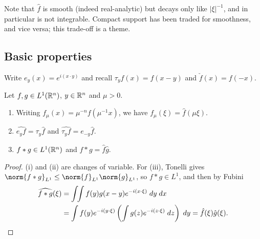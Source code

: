 \documentclass[a4paper]{scrartcl}
\begin{document}
\begin{example}
\begin{center}
\end{center}
	Note that $\hat f$ is smooth (indeed real-analytic) but decays only like $|\xi|^{-1}$, and in particular is not integrable. Compact support has been traded for smoothness, and vice versa; this trade-off is a theme.
\end{example}

\subsection{Basic properties}

Write $e_y(x) = e^{i(x\cdot y)}$ and recall $\tau_y f(x) = f(x-y)$ and $\check f(x) = f(-x)$.

\begin{lemma}\label{lem:ftbasic}
	Let $f, g \in L^1(\mathbb{R}^n)$, $y \in \mathbb{R}^n$ and $\mu > 0$.
	\begin{enumerate}[label=(\roman*)]
		\item Writing $f_\mu(x) = \mu^{-n}f(\mu^{-1}x)$, we have $\widehat{f_\mu}(\xi) = \hat f(\mu\xi)$.
		\item $\widehat{e_y f} = \tau_y \hat f$ and $\widehat{\tau_y f} = e_{-y}\hat f$.
		\item $f * g \in L^1(\mathbb{R}^n)$ and $\widehat{f*g} = \hat f \hat g$.
	\end{enumerate}
\end{lemma}

\begin{proof}
	(i) and (ii) are changes of variable. For (iii), Tonelli gives $\norm{f*g}_{L^1}\le\norm{f}_{L^1}\norm{g}_{L^1}$, so $f * g \in L^1$, and then by Fubini
	\begin{align*}
		\widehat{f*g}(\xi) &= \int\!\!\int f(y)g(x-y)e^{-i(x\cdot\xi)}\; d y \; d x \\
		&= \int f(y)e^{-i(y\cdot\xi)}\left( \int g(z)e^{-i(z\cdot\xi)}\; d z\right)\; d y = \hat f(\xi)\hat g(\xi). \qedhere
	\end{align*}
\end{proof}
\end{document}
